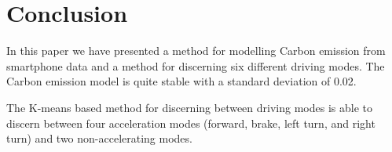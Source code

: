 \section{Conclusion}

In this paper we have presented a method for modelling Carbon emission from smartphone data and a method for discerning six different driving modes. The Carbon emission model is quite stable with a standard deviation of 0.02. 

The K-means based method for discerning between driving modes is able to discern between four acceleration modes (forward, brake, left turn, and right turn) and two non-accelerating modes.